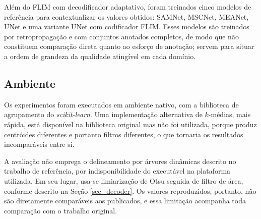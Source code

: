 Além do \ac{FLIM} com decodificador adaptativo, foram treinados cinco modelos de referência para contextualizar os valores obtidos: SAMNet, MSCNet, MEANet, UNet e uma variante UNet com codificador \ac{FLIM}. Esses modelos são treinados por retropropagação e com conjuntos anotados completos, de modo que não constituem comparação direta quanto ao esforço de anotação; servem para situar a ordem de grandeza da qualidade atingível em cada domínio.

\subsection{Ambiente}

Os experimentos foram executados em ambiente nativo, com a biblioteca de agrupamento do \textit{scikit-learn}. Uma implementação alternativa de $k$-médias, mais rápida, está disponível na biblioteca original mas não foi utilizada, porque produz centróides diferentes e portanto filtros diferentes, o que tornaria os resultados incomparáveis entre si.

A avaliação não emprega o delineamento por árvores dinâmicas descrito no trabalho de referência, por indisponibilidade do executável na plataforma utilizada. Em seu lugar, usa-se limiarização de Otsu seguida de filtro de área, conforme descrito na Seção \ref{sec_decoder}. Os valores reproduzidos, portanto, não são diretamente comparáveis aos publicados, e essa limitação acompanha toda comparação com o trabalho original.
